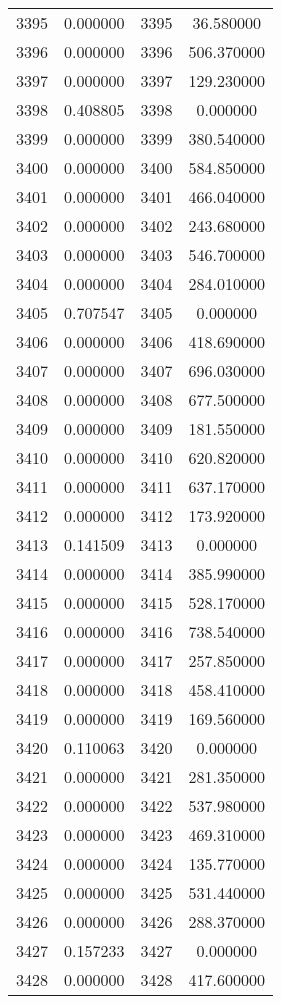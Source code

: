\documentclass[12pt]{article}
\begin{document}
\begin{longtable}{@{}cccc@{}}
3395 & 0.000000 & 3395 & 36.580000 \\
3396 & 0.000000 & 3396 & 506.370000 \\
3397 & 0.000000 & 3397 & 129.230000 \\
3398 & 0.408805 & 3398 & 0.000000 \\
3399 & 0.000000 & 3399 & 380.540000 \\
3400 & 0.000000 & 3400 & 584.850000 \\
3401 & 0.000000 & 3401 & 466.040000 \\
3402 & 0.000000 & 3402 & 243.680000 \\
3403 & 0.000000 & 3403 & 546.700000 \\
3404 & 0.000000 & 3404 & 284.010000 \\
3405 & 0.707547 & 3405 & 0.000000 \\
3406 & 0.000000 & 3406 & 418.690000 \\
3407 & 0.000000 & 3407 & 696.030000 \\
3408 & 0.000000 & 3408 & 677.500000 \\
3409 & 0.000000 & 3409 & 181.550000 \\
3410 & 0.000000 & 3410 & 620.820000 \\
3411 & 0.000000 & 3411 & 637.170000 \\
3412 & 0.000000 & 3412 & 173.920000 \\
3413 & 0.141509 & 3413 & 0.000000 \\
3414 & 0.000000 & 3414 & 385.990000 \\
3415 & 0.000000 & 3415 & 528.170000 \\
3416 & 0.000000 & 3416 & 738.540000 \\
3417 & 0.000000 & 3417 & 257.850000 \\
3418 & 0.000000 & 3418 & 458.410000 \\
3419 & 0.000000 & 3419 & 169.560000 \\
3420 & 0.110063 & 3420 & 0.000000 \\
3421 & 0.000000 & 3421 & 281.350000 \\
3422 & 0.000000 & 3422 & 537.980000 \\
3423 & 0.000000 & 3423 & 469.310000 \\
3424 & 0.000000 & 3424 & 135.770000 \\
3425 & 0.000000 & 3425 & 531.440000 \\
3426 & 0.000000 & 3426 & 288.370000 \\
3427 & 0.157233 & 3427 & 0.000000 \\
3428 & 0.000000 & 3428 & 417.600000 \\

\end{longtable}
\end{document}
